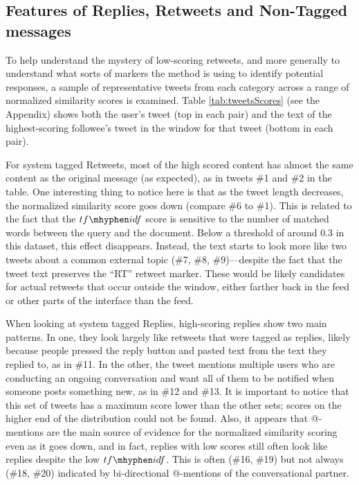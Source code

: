 \subsection{Features of Replies, Retweets and Non-Tagged messages}

To help understand the mystery of low-scoring retweets, and more generally to understand what sorts of markers the method is using to identify potential responses, a sample of representative tweets from each category across a range of normalized similarity scores is examined.  
Table \ref{tab:tweetsScores} (see the Appendix) shows both the user's tweet (top in each pair) and the text of the highest-scoring followee's tweet in the window for that tweet (bottom in each pair).

For system tagged Retweets, most of the high scored content has almost the same content as the original message (as expected), as in tweets \#1 and \#2 in the table.  One interesting thing to notice here is that as the tweet length decreases, the normalized similarity score goes down (compare \#6 to \#1). This is related to the fact that the $tf\mhyphen idf$ score is sensitive to the number of matched words between the query and the document.  
Below a threshold of around $0.3$ in this dataset, this effect disappears.  Instead, the text starts to look more like 
two tweets about a common external topic (\#7, \#8, \#9)---despite the fact that the tweet text preserves the ``RT'' retweet marker.  These would be likely candidates for actual retweets that occur outside the window, either farther back in the feed or other parts of the interface than the feed.

When looking at system tagged Replies, high-scoring replies show two main patterns.  In one, they look largely like retweets that were tagged as replies, likely because people pressed the reply button and pasted text from the text they replied to, as in \#11.  In the other, the tweet mentions multiple users who are conducting an ongoing conversation and want all of them to be notified when someone posts something new, as in \#12 and \#13.  It is important to notice that this set of tweets has a maximum score lower than the other sets; scores on the higher end of the distribution could not be found. Also, it appears that @-mentions are the main source of evidence for the normalized similarity scoring even as it goes down, and in fact, replies with low scores still often look like replies despite the low $tf\mhyphen idf$.  This is often (\#16, \#19) but not always (\#18, \#20) indicated by bi-directional @-mentions of the conversational partner.


